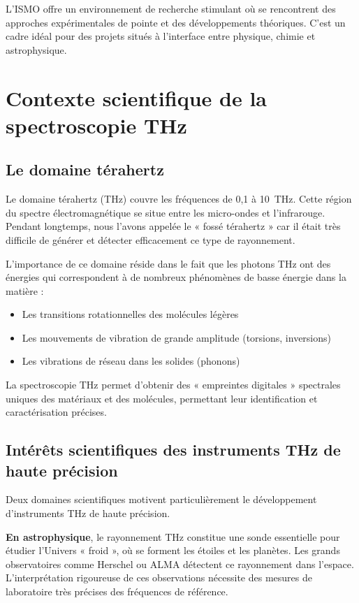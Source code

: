 L'ISMO offre un environnement de recherche stimulant où se rencontrent des approches expérimentales de pointe et des développements théoriques. C'est un cadre idéal pour des projets situés à l'interface entre physique, chimie et astrophysique.

\section{Contexte scientifique de la spectroscopie THz}

\subsection{Le domaine térahertz}

Le domaine térahertz (THz) couvre les fréquences de 0,1 à \SI{10}{\THz}. Cette région du spectre électromagnétique se situe entre les micro-ondes et l'infrarouge. Pendant longtemps, nous l'avons appelée le « fossé térahertz » car il était très difficile de générer et détecter efficacement ce type de rayonnement.

L'importance de ce domaine réside dans le fait que les photons THz ont des énergies qui correspondent à de nombreux phénomènes de basse énergie dans la matière :
\begin{itemize}
    \item Les transitions rotationnelles des molécules légères
    \item Les mouvements de vibration de grande amplitude (torsions, inversions)
    \item Les vibrations de réseau dans les solides (phonons)
\end{itemize}

La spectroscopie THz permet d'obtenir des « empreintes digitales » spectrales uniques des matériaux et des molécules, permettant leur identification et caractérisation précises.

\subsection{Intérêts scientifiques des instruments THz de haute précision}

Deux domaines scientifiques motivent particulièrement le développement d'instruments THz de haute précision.

\textbf{En astrophysique}, le rayonnement THz constitue une sonde essentielle pour étudier l'Univers « froid », où se forment les étoiles et les planètes. Les grands observatoires comme Herschel ou ALMA détectent ce rayonnement dans l'espace. L'interprétation rigoureuse de ces observations nécessite des mesures de laboratoire très précises des fréquences de référence.

